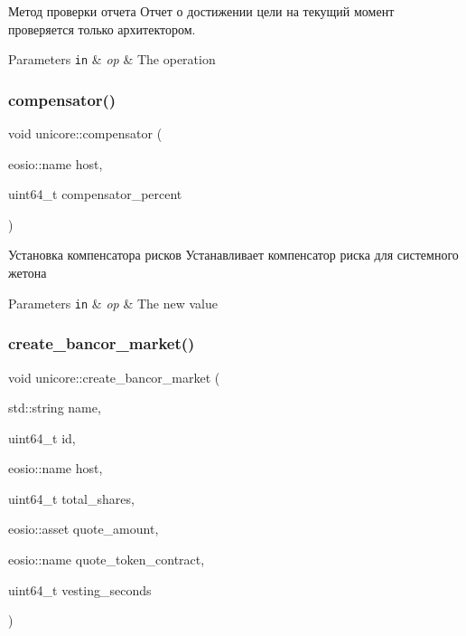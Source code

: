 Метод проверки отчета Отчет о достижении цели на текущий момент проверяется только архитектором. 


\begin{DoxyParams}[1]{Parameters}
\mbox{\tt in}  & {\em op} & The operation \\
\hline
\end{DoxyParams}
\mbox{\label{classunicore_abb38bcc39c9e3ca74f955944a84274fe}} 
\subsubsection{\texorpdfstring{compensator()}{compensator()}}
{\footnotesize\ttfamily void unicore\+::compensator (\begin{DoxyParamCaption}\item[{eosio\+::name}]{host,  }\item[{uint64\+\_\+t}]{compensator\+\_\+percent }\end{DoxyParamCaption})}



Установка компенсатора рисков Устанавливает компенсатор риска для системного жетона 


\begin{DoxyParams}[1]{Parameters}
\mbox{\tt in}  & {\em op} & The new value \\
\hline
\end{DoxyParams}
\mbox{\label{classunicore_a0ea88fc9a5ee27ea75a85e6b842aeba6}} 
\subsubsection{\texorpdfstring{create\+\_\+bancor\+\_\+market()}{create\_bancor\_market()}}
{\footnotesize\ttfamily void unicore\+::create\+\_\+bancor\+\_\+market (\begin{DoxyParamCaption}\item[{std\+::string}]{name,  }\item[{uint64\+\_\+t}]{id,  }\item[{eosio\+::name}]{host,  }\item[{uint64\+\_\+t}]{total\+\_\+shares,  }\item[{eosio\+::asset}]{quote\+\_\+amount,  }\item[{eosio\+::name}]{quote\+\_\+token\+\_\+contract,  }\item[{uint64\+\_\+t}]{vesting\+\_\+seconds }\end{DoxyParamCaption})\hspace{0.3cm}{\ttfamily [static]}}



